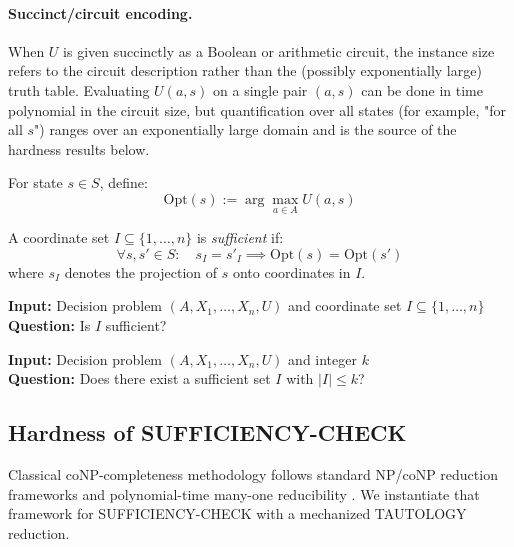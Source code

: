 \paragraph{Succinct/circuit encoding.}
When $U$ is given succinctly as a Boolean or arithmetic circuit, the instance size refers to the circuit description rather than the (possibly exponentially large) truth table. Evaluating $U(a,s)$ on a single pair $(a,s)$ can be done in time polynomial in the circuit size, but quantification over all states (for example, "for all $s$") ranges over an exponentially large domain and is the source of the hardness results below.

\begin{definition}
For state $s \in S$, define:
\[
\text{Opt}(s) := \arg\max_{a \in A} U(a, s)
\]
\end{definition}

\begin{definition}
A coordinate set $I \subseteq \{1, \ldots, n\}$ is \emph{sufficient} if:
\[
\forall s, s' \in S: \quad s_I = s'_I \implies \text{Opt}(s) = \text{Opt}(s')
\]
where $s_I$ denotes the projection of $s$ onto coordinates in $I$.
\end{definition}

\begin{problem}
\textbf{Input:} Decision problem $(A, X_1, \ldots, X_n, U)$ and coordinate set $I \subseteq \{1,\ldots,n\}$ \\
\textbf{Question:} Is $I$ sufficient?
\end{problem}

\begin{problem}
\textbf{Input:} Decision problem $(A, X_1, \ldots, X_n, U)$ and integer $k$ \\
\textbf{Question:} Does there exist a sufficient set $I$ with $|I| \leq k$?
\end{problem}

\subsection{Hardness of SUFFICIENCY-CHECK}

Classical coNP-completeness methodology follows standard NP/coNP reduction frameworks and
polynomial-time many-one reducibility \cite{papadimitriou1994complexity,arora2009computational}.
We instantiate that framework for SUFFICIENCY-CHECK with a mechanized TAUTOLOGY reduction.

